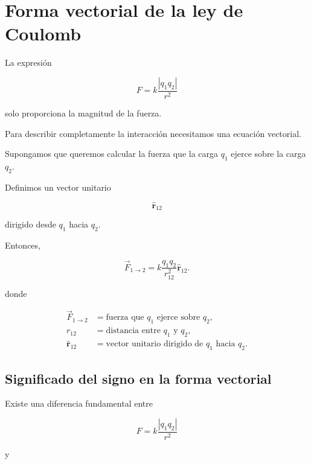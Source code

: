 
\section{Forma vectorial de la ley de Coulomb}

La expresión

\[
F
=
k\frac{|q_1q_2|}{r^2}
\]

solo proporciona la magnitud de la fuerza.

Para describir completamente la interacción necesitamos una ecuación
vectorial.

Supongamos que queremos calcular la fuerza que la carga \(q_1\) ejerce sobre
la carga \(q_2\).

Definimos un vector unitario

\[
\hat{\mathbf{r}}_{12}
\]

dirigido desde \(q_1\) hacia \(q_2\).

Entonces,

\begin{equation}
    \boxed{
    \vec{F}_{1\to2}
    =
    k
    \frac{q_1q_2}{r_{12}^{2}}
    \hat{\mathbf{r}}_{12}
    }.
    \label{eq:coulomb_vectorial}
\end{equation}

donde

\begin{align*}
    \vec{F}_{1\to2}
    &=
    \text{fuerza que }q_1\text{ ejerce sobre }q_2,
    \\
    r_{12}
    &=
    \text{distancia entre }q_1\text{ y }q_2,
    \\
    \hat{\mathbf{r}}_{12}
    &=
    \text{vector unitario dirigido de }q_1\text{ hacia }q_2.
\end{align*}



\subsection{Significado del signo en la forma vectorial}

Existe una diferencia fundamental entre

\[
F
=
k\frac{|q_1q_2|}{r^2}
\]

y

